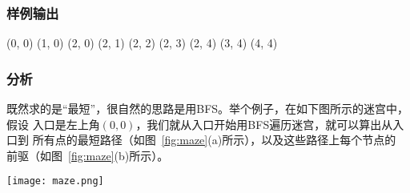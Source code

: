 \subsubsection{样例输出}
(0, 0)
(1, 0)
(2, 0)
(2, 1)
(2, 2)
(2, 3)
(2, 4)
(3, 4)
(4, 4)

\subsubsection{分析}
既然求的是“最短”，很自然的思路是用BFS。举个例子，在如下图所示的迷宫中，假设
入口是左上角$(0,0)$，我们就从入口开始用BFS遍历迷宫，就可以算出从入口到
所有点的最短路径（如图~\ref{fig:maze}(a)所示），以及这些路径上每个节点的
前驱（如图~\ref{fig:maze}(b)所示）。

\begin{center}
\texttt{[image: maze.png]}\\
\label{fig:maze}
\end{center}

